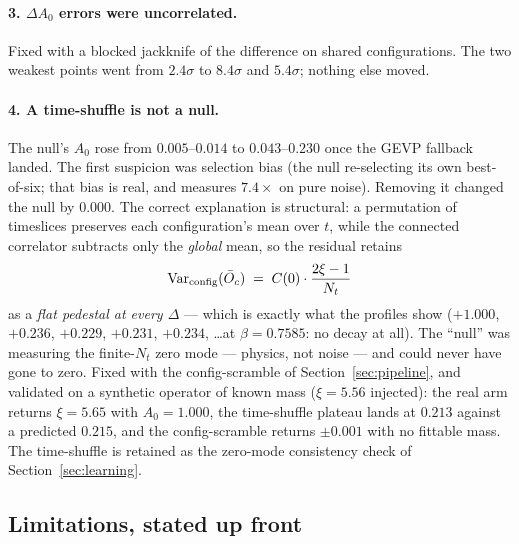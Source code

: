 \documentclass[11pt,a4paper]{article}
\newcommand{\Obar}{\bar{O}}
\begin{document}
\paragraph{3. $\Delta A_0$ errors were uncorrelated.} Fixed with a blocked
jackknife of the difference on shared configurations. The two weakest points
went from $2.4\sigma$ to $8.4\sigma$ and $5.4\sigma$; nothing else moved.

\paragraph{4. A time-shuffle is not a null.} The null's $A_0$ rose from
$0.005$--$0.014$ to $0.043$--$0.230$ once the GEVP fallback landed. The first
suspicion was selection bias (the null re-selecting its own best-of-six; that
bias is real, and measures $7.4\times$ on pure noise). Removing it changed the
null by $0.000$. The correct explanation is structural: a permutation of
timeslices preserves each configuration's mean over $t$, while the connected
correlator subtracts only the \emph{global} mean, so the residual retains
\begin{equation}
  \operatorname{Var}_{\rm config}(\Obar_c) \;=\; C(0)\cdot\frac{2\xi-1}{N_t}
\end{equation}
as a \emph{flat pedestal at every $\Delta$} --- which is exactly what the
profiles show ($+1.000$, $+0.236$, $+0.229$, $+0.231$, $+0.234$, \ldots at
$\beta=0.7585$: no decay at all). The ``null'' was measuring the finite-$N_t$
zero mode --- physics, not noise --- and could never have gone to zero. Fixed
with the config-scramble of Section~\ref{sec:pipeline}, and validated on a
synthetic operator of known mass ($\xi = 5.56$ injected): the real arm returns
$\xi = 5.65$ with $A_0 = 1.000$, the time-shuffle plateau lands at $0.213$
against a predicted $0.215$, and the config-scramble returns $\pm0.001$ with no
fittable mass. The time-shuffle is retained as the zero-mode consistency check
of Section~\ref{sec:learning}.

\subsection{Limitations, stated up front}
\label{sec:limits}
\end{document}
